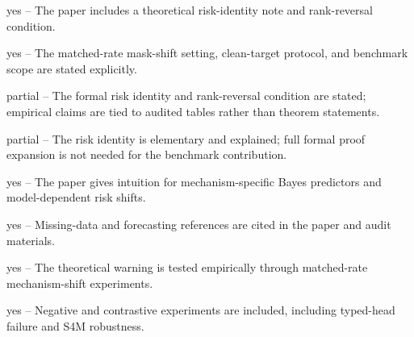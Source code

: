 \documentclass[letterpaper]{article}
\begin{document}
\begin{itemize}

yes -- The paper includes a theoretical risk-identity note and rank-reversal condition.

        \begin{itemize}
	
	yes -- The matched-rate mask-shift setting, clean-target protocol, and benchmark scope are stated explicitly.

	partial -- The formal risk identity and rank-reversal condition are stated; empirical claims are tied to audited tables rather than theorem statements.

	partial -- The risk identity is elementary and explained; full formal proof expansion is not needed for the benchmark contribution.

	yes -- The paper gives intuition for mechanism-specific Bayes predictors and model-dependent risk shifts.

	yes -- Missing-data and forecasting references are cited in the paper and audit materials.

	yes -- The theoretical warning is tested empirically through matched-rate mechanism-shift experiments.

	yes -- Negative and contrastive experiments are included, including typed-head failure and S4M robustness.
	
	\end{itemize}
\end{itemize}
\end{document}
